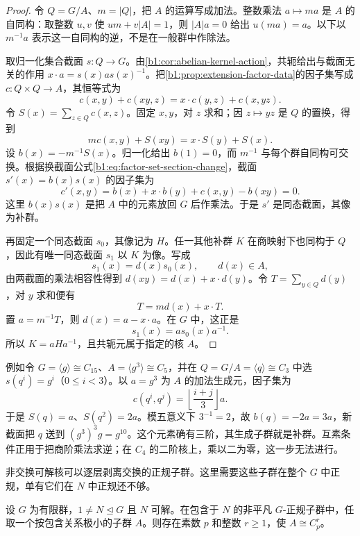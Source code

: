 \begin{proof}
	令 \(Q=G/A\)、\(m=|Q|\)，把 \(A\) 的运算写成加法。整数乘法 \(a\mapsto ma\) 是 \(A\) 的自同构：取整数 \(u,v\) 使 \(um+v|A|=1\)，则 \(|A|a=0\) 给出 \(u(ma)=a\)。以下以 \(m^{-1}a\) 表示这一自同构的逆，不是在一般群中作除法。

	取归一化集合截面 \(s:Q\rightarrow G\)。由\cref{b1:cor:abelian-kernel-action}，共轭给出与截面无关的作用 \(x\cdot a=s(x)as(x)^{-1}\)。把\cref{b1:prop:extension-factor-data}的因子集写成 \(c:Q\times Q\rightarrow A\)，其恒等式为
	\[
		c(x,y)+c(xy,z)=x\cdot c(y,z)+c(x,yz).
	\]
	令 \(S(x)=\sum_{z\in Q}c(x,z)\)。固定 \(x,y\)，对 \(z\) 求和；因 \(z\mapsto yz\) 是 \(Q\) 的置换，得到
	\[
		m c(x,y)+S(xy)=x\cdot S(y)+S(x).
	\]
	设 \(b(x)=-m^{-1}S(x)\)。归一化给出 \(b(1)=0\)，而 \(m^{-1}\) 与每个群自同构可交换。根据换截面公式\eqref{b1:eq:factor-set-section-change}，截面 \(s'(x)=b(x)s(x)\) 的因子集为
	\[
		c'(x,y)=b(x)+x\cdot b(y)+c(x,y)-b(xy)=0.
	\]
	这里 \(b(x)s(x)\) 是把 \(A\) 中的元素放回 \(G\) 后作乘法。于是 \(s'\) 是同态截面，其像为补群。

	再固定一个同态截面 \(s_0\)，其像记为 \(H\)。任一其他补群 \(K\) 在商映射下也同构于 \(Q\)，因此有唯一同态截面 \(s_1\) 以 \(K\) 为像。写成
	\[
		s_1(x)=d(x)s_0(x),\qquad d(x)\in A,
	\]
	由两截面的乘法相容性得到 \(d(xy)=d(x)+x\cdot d(y)\)。令 \(T=\sum_{y\in Q}d(y)\)，对 \(y\) 求和便有
	\[
		T=m d(x)+x\cdot T.
	\]
	置 \(a=m^{-1}T\)，则 \(d(x)=a-x\cdot a\)。在 \(G\) 中，这正是
	\[
		s_1(x)=a s_0(x)a^{-1}.
	\]
	所以 \(K=aHa^{-1}\)，且共轭元属于指定的核 \(A\)。
\end{proof}

例如令 \(G=\langle g\rangle\cong C_{15}\)、\(A=\langle g^3\rangle\cong C_5\)，并在 \(Q=G/A=\langle q\rangle\cong C_3\) 中选 \(s(q^i)=g^i\)（\(0\leq i<3\)）。以 \(a=g^3\) 为 \(A\) 的加法生成元，因子集为
\[
	c(q^i,q^j)=\left\lfloor\dfrac{i+j}{3}\right\rfloor a.
\]
于是 \(S(q)=a\)、\(S(q^2)=2a\)。模五意义下 \(3^{-1}=2\)，故 \(b(q)=-2a=3a\)，新截面把 \(q\) 送到 \((g^3)^3g=g^{10}\)。这个元素确有三阶，其生成子群就是补群。互素条件正用于把商阶乘法求逆；在 \(C_4\) 的二阶核上，乘以二为零，这一步无法进行。

\ProseParagraphBreak
非交换可解核可以逐层剥离交换的正规子群。这里需要这些子群在整个 \(G\) 中正规，单有它们在 \(N\) 中正规还不够。

\begin{lemma}\label{b1:lem:C-minimal-normal-solvable}
	设 \(G\) 为有限群，\(1\ne N\trianglelefteq G\) 且 \(N\) 可解。在包含于 \(N\) 的非平凡 \(G\)-正规子群中，任取一个按包含关系极小的子群 \(A\)。则存在素数 \(p\) 和整数 \(r\geq1\)，使 \(A\cong C_p^r\)。
\end{lemma}

